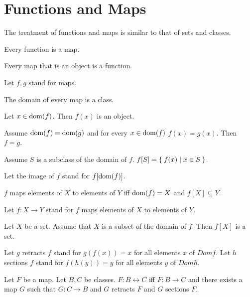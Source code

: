 \documentclass[11pt]{article}
\begin{document}
\section{Functions and Maps}

The treatment of functions and maps is similar to that
of sets and classes.

\begin{forthel}
  \begin{lemma}
    Every function is a map.
  \end{lemma}

  \begin{lemma}
    Every map that is an object is a function.
  \end{lemma}

  Let $f, g$ stand for maps.

  \begin{lemma}
    The domain of every map is a class.
  \end{lemma}

  \begin{lemma}
    Let $x \in \operatorname{dom}(f)$.
    Then $f(x)$ is an object.
  \end{lemma}

  \begin{lemma}
    Assume $\operatorname{dom}(f) = \operatorname{dom}(g)$ and for every $x \in \operatorname{dom}(f)$ $f(x) = g(x)$.
    Then $f = g$.
  \end{lemma}

  \begin{definition}
    Assume $S$ is a subclass of the domain of $f$.
    $f[S] = \Set{f(x) | x \in S}$.
  \end{definition}

  Let the image of $f$ stand for $f[\operatorname{dom}(f)]$.

  \begin{definition}
    $f$ maps elements of $X$ to elements of $Y$ iff $\operatorname{dom} (f) = X$ and $f[X]
    \subseteq Y$.
  \end{definition}

  Let $f : X \rightarrow Y$ stand for $f$ maps elements of $X$ to elements of
  $Y$.

  \begin{axiom}
    Let $X$ be a set.
    Assume that $X$ is a subset of the domain of $f$.
    Then $f[X]$ is a set.
  \end{axiom}

  Let $g$ retracts $f$ stand for $g(f(x)) = x$ for all elements $x$ of $Dom f$.
  Let $h$ sections $f$ stand for $f(h(y)) = y$ for all elements $y$ of $Dom h$.

  \begin{definition}
    Let $F$ be a map.
    Let $B, C$ be classes.
    $F : B\leftrightarrow C$ iff $F : B\rightarrow C$ and there exists a map $G$
    such that $G : C\rightarrow B$ and $G$ retracts $F$ and $G$ sections $F$.
  \end{definition}
\end{forthel}
\end{document}
